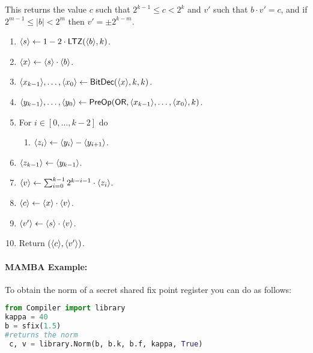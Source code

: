 This returns the value $c$ such that $2^{k-1} \le c <2^k$
and $v'$ such that $b \cdot v' = c$,
and if $2^{m-1} \le |b| <2^m$ then $v'= \pm 2^{k-m}$.
\begin{enumerate}
\item $\langle s \rangle \leftarrow 1-2 \cdot \mathsf{LTZ}(\langle b \rangle,k)$.
\item $\langle x \rangle \leftarrow \langle s \rangle \cdot \langle b \rangle$.
\item $\langle x_{k-1} \rangle,\ldots,\langle x_0 \rangle \leftarrow \mathsf{BitDec}(\langle x \rangle,k,k)$.
\item $\langle y_{k-1} \rangle,\ldots,\langle y_0 \rangle \leftarrow \mathsf{PreOp}(\mathsf{OR},\langle x_{k-1} \rangle,\ldots,\langle x_0 \rangle,k)$.
\item For $i \in [0,\ldots,k-2]$ do 
\begin{enumerate}
  \item $\langle z_i \rangle \leftarrow \langle y_i \rangle-\langle y_{i+1} \rangle$.
\end{enumerate}
\item $\langle z_{k-1} \rangle \leftarrow \langle y_{k-1} \rangle$.
\item $\langle v \rangle \leftarrow \sum_{i=0}^{k-1} 2^{k-i-1} \cdot \langle z_i \rangle$.
\item $\langle c \rangle \leftarrow \langle x \rangle \cdot \langle v \rangle$.
\item $\langle v' \rangle \leftarrow \langle s \rangle \cdot \langle v \rangle$.
\item Return $(\langle c \rangle, \langle v' \rangle)$.
\end{enumerate}
\paragraph{MAMBA Example:} To obtain the norm of a secret shared fix point register you can do as follows:
\begin{lstlisting}[language={python}]
from Compiler import library
kappa = 40 
b = sfix(1.5)
#returns the norm
 c, v = library.Norm(b, b.k, b.f, kappa, True)
\end{lstlisting}

